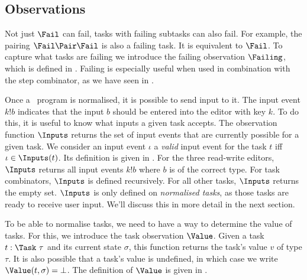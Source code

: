 \subsection[sec:observations]{Observations}

Not just $\Fail$ can fail, tasks with failing subtasks can also fail.
For example, the pairing $\Fail \Pair \Fail$ is also a failing task.
It is equivalent to $\Fail$.
To capture what tasks are failing we introduce the failing observation $\Failing$, which is defined in .
Failing is especially useful when used in combination with the step combinator,
as we have seen in .


  {
    {}}



Once a \TOPHAT\ program is normalised, it is possible to send input to it.
The input event $k!b$ indicates that the input $b$ should be entered into the editor with key $k$.
To do this, it is useful to know what inputs a given task accepts.
The observation function $\Inputs$ returns the set of input events that are currently possible for a given task.
We consider an input event $\iota$ a \emph{valid} input event for the task $t$ iff $\iota \in \Inputs(t)$.
Its definition is given in .
For the three read-write editors, $\Inputs$ returns all input events $k!b$ where $b$ is of the correct type.
For task combinators, $\Inputs$ is defined recursively.
For all other tasks, $\Inputs$ returns the empty set.
$\Inputs$ is only defined on \emph{normalised tasks},
as those tasks are ready to receive user input.
We'll discuss this in more detail in the next section.


To be able to normalise tasks, we need to have a way to determine the value of tasks.
For this, we introduce the task observation $\Value$.
Given a task $t : \Task\ \tau$ and its current state $\sigma$, this function returns the task's value $v$ of type $\tau$.
It is also possible that a task's value is undefined, in which case we write $\Value(t,\sigma) = \bot$.
The definition of $\Value$ is given in .

